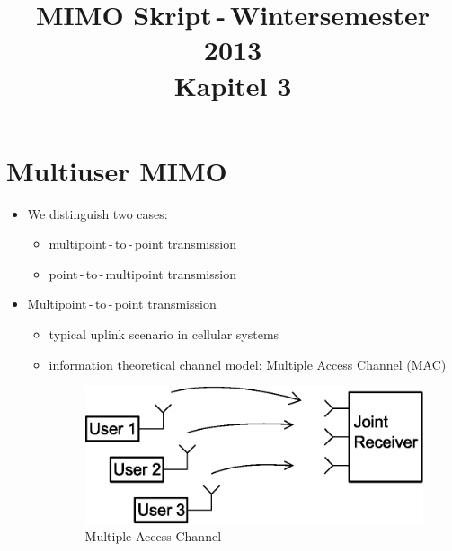 \documentclass[a4paper, 10pt]{article}
\title{MIMO Skript\,-\,Wintersemester 2013 \\ Kapitel 3}
\date{}
\begin{document}
\maketitle
\tableofcontents
\setcounter{section}{2}
\section{Multiuser MIMO}
\begin{itemize}
	\item We distinguish two cases:
	\begin{itemize}
		\item multipoint\,-\,to\,-\,point transmission
		\item point\,-\,to\,-\,multipoint transmission
	\end{itemize}
	\item Multipoint\,-\,to\,-\,point transmission
	\begin{itemize}
		\item typical uplink scenario in cellular systems
		\item information theoretical channel model: Multiple Access Channel (MAC)
		\begin{figure}[h]
			\centering
			\includegraphics[scale=0.8]{MAC}
			\caption{Multiple Access Channel}
			\label{fig:MAC}		
		\end{figure}

\end{itemize}
\end{itemize}
\end{document}
